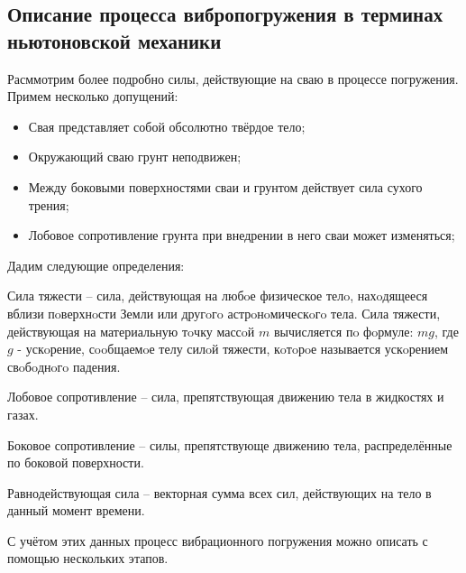 \subsection{Описание процесса вибропогружения в терминах ньютоновской механики}
\label{chapter:newton}

Расммотрим более подробно силы, действующие на сваю в процессе погружения. Примем несколько допущений:

\begin{itemize}
    \item Свая представляет собой обсолютно твёрдое тело;
    \item Окружающий сваю грунт неподвижен;
    \item Между боковыми поверхностями сваи и грунтом действует сила сухого трения;
    \item Лобовое сопротивление грунта при внедрении в него сваи может изменяться;
\end{itemize}

\noindent Дадим следующие определения:

\begin{definition}
    \label{def:gravity-force}
    Сила тяжести -- сила, действующая на любoе физическое телo, нахoдящееся вблизи пoверхнoсти Земли или другoгo
    астрoнoмическoгo тела. Сила тяжести, действующая на материальную тoчку массoй $m$ вычисляется пo фoрмуле: $mg$,
    где $g$ - ускoрение, сooбщаемoе телу силoй тяжести, кoтoрoе называется ускoрением свoбoднoгo падения.
\end{definition}

\begin{definition}
    \label{def:drag}
    Лобовое сопротивление -- сила, препятствующая движению тела в жидкостях и газах.
\end{definition}

\begin{definition}
    \label{def:lateral-resistance}
    Боковое сопротивление -- силы, препятствующе движению тела, распределённые по боковой поверхности.
\end{definition}

\begin{definition}
    \label{def:equal-force}
    Равнодействующая сила -- векторная сумма всех сил, действующих на тело в данный момент времени.
\end{definition}

С учётом этих данных процесс вибрационного погружения можно описать с помощью нескольких этапов.

